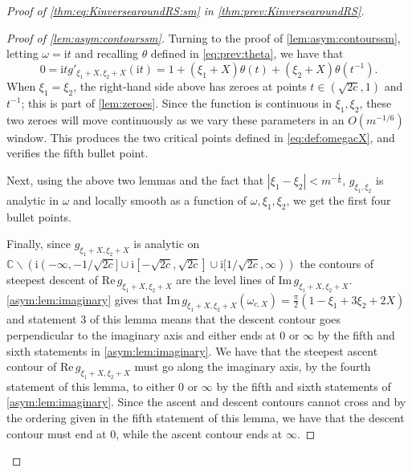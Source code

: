 \documentclass[11pt,twoside]{amsart}
\theoremstyle{plain}
\numberwithin{quest}{section}
\theoremstyle{remark}
\numberwithin{rem}{section}
\theoremstyle{definition}
\begin{document}
\begin{proof}[Proof of \eqref{thm:eq:KinversearoundRS:sm} in
		\cref{thm:prev:KinversearoundRS}]
\begin{proof}[Proof of \cref{lem:asym:contourssm}]
Turning to the proof of \cref{lem:asym:contourssm}, letting $\omega = \mathrm{i} t$ and recalling $\theta$ defined in \eqref{eq:prev:theta}, we have that 
			\begin{equation*}
				0=\mathrm{i} t g'_{\xi_1+X,\xi_2+X}(\mathrm{i}t)= 1 +(\xi_1+X)\theta(t)+(\xi_2+X)\theta(t^{-1}).
			\end{equation*}
            When $\xi_1 = \xi_2$, the right-hand side above has zeroes at points $t \in (\sqrt{2c}, 1)$ and $t^{-1}$; this is part of \cref{lem:zeroes}. Since the function is continuous in $\xi_1, \xi_2$, these two zeroes will move continuously as we vary these parameters in an $O(m^{-1/6})$ window. This produces the two critical points defined in \eqref{eq:def:omegacX}, and verifies the fifth bullet point.

Next, using the above two lemmas and the fact that $|\xi_1-\xi_2|<m^{-\frac{1}{6}}$,  $g_{\xi_1,\xi_2}$ is analytic in $\omega$ and locally smooth as a function of $\omega, \xi_1,\xi_2$, we get the first four bullet points.

			
			Finally, since $g_{\xi_1+X,\xi_2+X}$ is analytic on $\mathbb{C}\backslash(\mathrm{i}(-\infty,-1/\sqrt{2c}]\cup \mathrm{i} [-\sqrt{2c},\sqrt{2c}] \cup \mathrm{i} [1/\sqrt{2c},\infty))$ the contours of steepest descent of $\mathrm{Re}\,g_{\xi_1+X,\xi_2+X}$ are the level lines of $\mathrm{Im}\, g_{\xi_1+X,\xi_2+X}$. \cref{asym:lem:imaginary} gives that $\mathrm{Im}\, g_{\xi_1+X,\xi_2+X} ( \omega_{c,X})=\frac{\pi}{2}(1-\xi_1+3\xi_2+2X)$ and statement 3 of this lemma means that the descent contour goes perpendicular to the imaginary axis and either ends at 0 or $\infty$ by the fifth and sixth statements in \cref{asym:lem:imaginary}. We have that the steepest ascent contour of  $\mathrm{Re}\,g_{\xi_1+X,\xi_2+X}$ must go along the imaginary axis, by the fourth statement of this lemma, to either 0 or $\infty$ by the fifth and sixth statements of \cref{asym:lem:imaginary}. Since the ascent and descent contours cannot cross and by the ordering given in the fifth statement of this lemma, we have that the descent contour must end at 0, while the ascent contour ends at $\infty$. 
		\end{proof}
		
		
		
		
	\end{proof}
	
\end{document}

